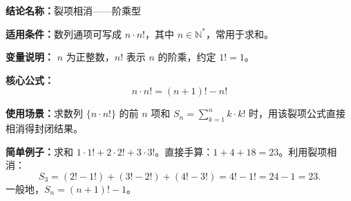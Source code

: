 \textbf{结论名称：}裂项相消——阶乘型

\textbf{适用条件：}数列通项可写成 \(n\cdot n!\)，其中 \(n\in\mathbb{N}^*\)，常用于求和。

\textbf{变量说明：} \(n\) 为正整数，\(n!\) 表示 \(n\) 的阶乘，约定 \(1! = 1\)。

\textbf{核心公式：}
\[
\boxed{n\cdot n! = (n+1)! - n!}
\]

\textbf{使用场景：}求数列 \(\{n\cdot n!\}\) 的前 \(n\) 项和 \(S_n = \sum_{k=1}^{n} k\cdot k!\) 时，用该裂项公式直接相消得封闭结果。

\textbf{简单例子：}求和 \(1\cdot1! + 2\cdot2! + 3\cdot3!\)。直接手算：\(1 + 4 + 18 = 23\)。利用裂项相消：
\[
S_3 = (2!-1!) + (3!-2!) + (4!-3!) = 4! - 1! = 24 - 1 = 23.
\]
一般地，\(S_n = (n+1)! - 1\)。
